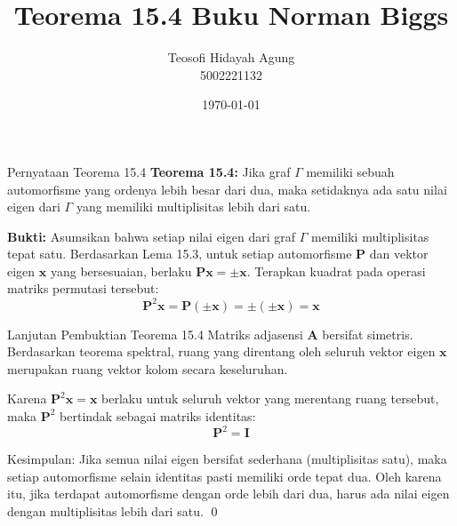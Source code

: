 \documentclass[aspectratio=169]{beamer}
\date{\today}
\title[Aljabar Graf]{Teorema 15.4 Buku Norman Biggs}
\author[Teosofi H.\ A.]{Teosofi Hidayah Agung \\ 5002221132}
\institute[Matematika ITS]{Departemen Matematika\\ Institut Teknologi Sepuluh Nopember}
\begin{document}
\frame{\titlepage}

\begin{frame}{Pernyataan Teorema 15.4}
  \textbf{Teorema 15.4:}
  Jika graf $\Gamma$ memiliki sebuah automorfisme yang ordenya lebih besar dari dua, maka setidaknya ada satu nilai eigen dari $\Gamma$ yang memiliki multiplisitas lebih dari satu.

  \vspace{0.3cm}
  \textbf{Bukti:} Asumsikan bahwa setiap nilai eigen dari graf $\Gamma$ memiliki multiplisitas tepat satu.
  Berdasarkan Lema 15.3, untuk setiap automorfisme $\mathbf{P}$ dan vektor eigen $\mathbf{x}$ yang bersesuaian, berlaku $\mathbf{P}\mathbf{x} = \pm \mathbf{x}$.
  Terapkan kuadrat pada operasi matriks permutasi tersebut:
  $$ \mathbf{P}^2 \mathbf{x} = \mathbf{P}(\pm \mathbf{x}) = \pm(\pm \mathbf{x}) = \mathbf{x} $$
\end{frame}

\begin{frame}{Lanjutan Pembuktian Teorema 15.4}
  Matriks adjasensi $\mathbf{A}$ bersifat simetris. Berdasarkan teorema spektral, ruang yang direntang oleh seluruh vektor eigen $\mathbf{x}$ merupakan ruang vektor kolom secara keseluruhan.

  Karena $\mathbf{P}^2 \mathbf{x} = \mathbf{x}$ berlaku untuk seluruh vektor yang merentang ruang tersebut, maka $\mathbf{P}^2$ bertindak sebagai matriks identitas:
  $$ \mathbf{P}^2 = \mathbf{I} $$

  Kesimpulan: Jika semua nilai eigen bersifat sederhana (multiplisitas satu), maka setiap automorfisme selain identitas pasti memiliki orde tepat dua. Oleh karena itu, jika terdapat automorfisme dengan orde lebih dari dua, harus ada nilai eigen dengan multiplisitas lebih dari satu. \qed
\end{frame}
\end{document}
